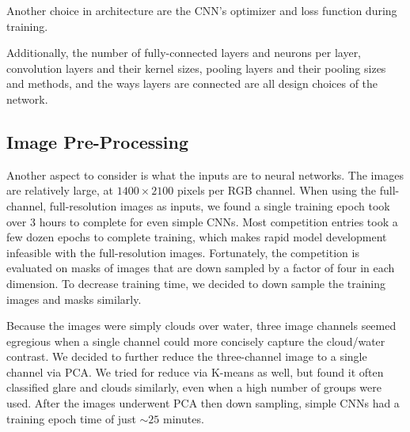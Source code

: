 Another choice in architecture are the CNN's optimizer and loss function during training. 

Additionally, the number of fully-connected layers and neurons per layer, convolution layers and their kernel sizes, pooling layers and their pooling sizes and methods, and the ways layers are connected are all design choices of the network. 

\subsection*{Image Pre-Processing}
Another aspect to consider is what the inputs are to neural networks. The images are relatively large, at \(1400 \times 2100\) pixels per RGB channel. When using the full-channel, full-resolution images as inputs, we found a single training epoch took over 3 hours to complete for even simple CNNs. Most competition entries took a few dozen epochs to complete training, which makes rapid model development infeasible with the full-resolution images. Fortunately, the competition is evaluated on masks of images that are down sampled by a factor of four in each dimension. To decrease training time, we decided to down sample the training images and masks similarly.

Because the images were simply clouds over water, three image channels seemed egregious when a single channel could more concisely capture the cloud/water contrast. We decided to further reduce the three-channel image to a single channel via PCA. We tried for reduce via K-means as well, but found it often classified glare and clouds similarly, even when a high number of groups were used. After the images underwent PCA then down sampling, simple CNNs had a training epoch time of just \(\sim25\) minutes. 

